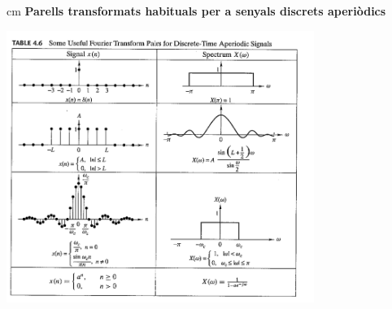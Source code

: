 \documentclass{article}
\begin{document}
\begin{description}
 cm
\noindent
\textbf{Parells transformats habituals per a senyals discrets aperi\`odics} 

\begin{center}
\includegraphics[width=10cm]{tabTFpairs.png}
\end{center}


\end{description}
\end{document}
